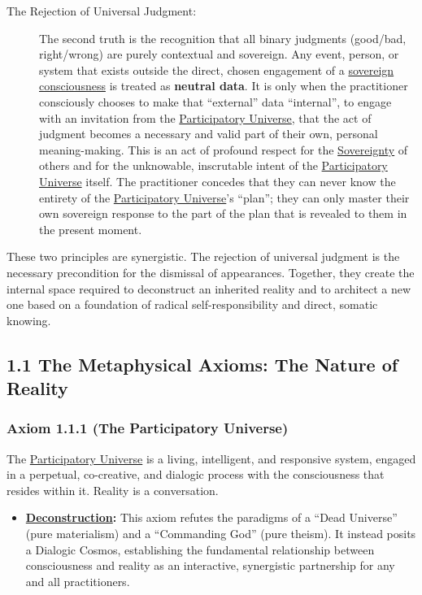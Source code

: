 \documentclass{article}
\begin{document}
\begin{description}
    \item[The Rejection of Universal Judgment:] The second truth is the recognition that all binary judgments (good/bad, right/wrong) are purely contextual and sovereign. Any event, person, or system that exists outside the direct, chosen engagement of a \hyperlink{gloss:sovereign_consciousness}{sovereign consciousness} is treated as \textbf{neutral data}. It is only when the practitioner consciously chooses to make that ``external'' data ``internal'', to engage with an invitation from the \hyperlink{gloss:participatory_universe}{Participatory Universe}, that the act of judgment becomes a necessary and valid part of their own, personal meaning-making. This is an act of profound respect for the \hyperlink{gloss:sovereignty}{Sovereignty} of others and for the unknowable, inscrutable intent of the \hyperlink{gloss:participatory_universe}{Participatory Universe} itself. The practitioner concedes that they can never know the entirety of the \hyperlink{gloss:participatory_universe}{Participatory Universe}'s ``plan''; they can only master their own sovereign response to the part of the plan that is revealed to them in the present moment.
\end{description}

These two principles are synergistic. The rejection of universal judgment is the necessary precondition for the dismissal of appearances. Together, they create the internal space required to deconstruct an inherited reality and to architect a new one based on a foundation of radical self-responsibility and direct, somatic knowing.

\subsection*{1.1 The Metaphysical Axioms: The Nature of Reality}

\subsubsection*{Axiom 1.1.1 (The Participatory Universe)} 
The \hyperlink{gloss:participatory_universe}{Participatory Universe} is a living, intelligent, and responsive system, engaged in a perpetual, co-creative, and dialogic process with the consciousness that resides within it. Reality is a conversation.
\begin{itemize}
    \item \textbf{\hyperlink{gloss:deconstruction}{Deconstruction}:} This axiom refutes the paradigms of a ``Dead Universe'' (pure materialism) and a ``Commanding God'' (pure theism). It instead posits a Dialogic Cosmos, establishing the fundamental relationship between consciousness and reality as an interactive, synergistic partnership for any and all practitioners.
\end{itemize}
\end{document}
